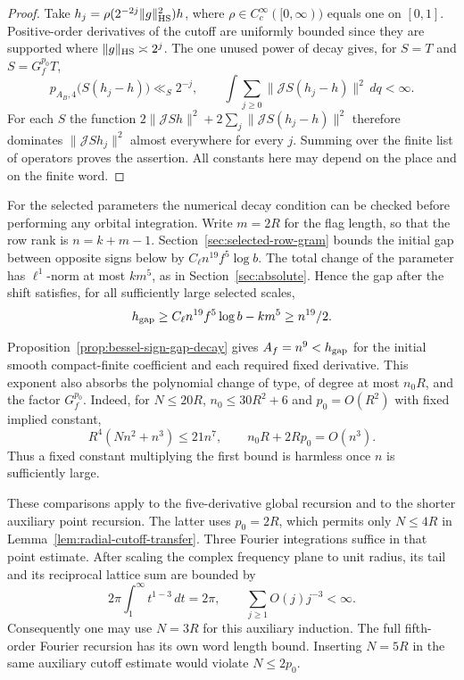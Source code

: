 \begin{proof}
Take \(h_j=\rho(2^{-2j}\|g\|_{\rm HS}^2)h\), where \(\rho\in C_c^\infty([0,\infty))\) equals one on \([0,1]\). Positive-order derivatives of the cutoff are uniformly bounded since they are supported where \(\|g\|_{\rm HS}\asymp 2^j\). The one unused power of decay gives, for \(S=T\) and \(S=G_f^{p_0}T\),
\[
 p_{A_B,4}\bigl(S(h_j-h)\bigr)\ll_S 2^{-j},\qquad
 \int\sum_{j\ge0}\|\mathcal JS(h_j-h)\|^2\,dq<\infty .
\]
For each \(S\) the function \(2\|\mathcal JSh\|^2+2\sum_j\|\mathcal JS(h_j-h)\|^2\) therefore dominates \(\|\mathcal JSh_j\|^2\) almost everywhere for every \(j\). Summing over the finite list of operators proves the assertion. All constants here may depend on the place and on the finite word.
\end{proof}

For the selected parameters the numerical decay condition can be checked before performing any orbital integration. Write \(m=2R\) for the flag length, so that the row rank is \(n=k+m-1\). Section~\ref{sec:selected-row-gram} bounds the initial gap between opposite signs below by \(C_\ell n^{19}f^5\log b\). The total change of the parameter has \(\ell^1\)-norm at most \(km^5\), as in Section~\ref{sec:absolute}. Hence the gap after the shift satisfies, for all sufficiently large selected scales,
\[
     h_{\rm gap}\ge C_\ell n^{19}f^5\log b-km^5\ge n^{19}/2 .
\]

Proposition~\ref{prop:bessel-sign-gap-decay} gives \(A_f=n^9<h_{\rm gap}\) for the initial smooth compact-finite coefficient and each required fixed derivative. This exponent also absorbs the polynomial change of type, of degree at most \(n_0R\), and the factor \(G_f^{p_0}\). Indeed, for \(N\le20R\), \(n_0\le30R^2+6\) and \(p_0=O(R^2)\) with fixed implied constant,
\[
 R^4(Nn^2+n^3)\le21n^7,\qquad n_0R+2Rp_0=O(n^3).
\]
Thus a fixed constant multiplying the first bound is harmless once \(n\) is sufficiently large.

These comparisons apply to the five-derivative global recursion and to the shorter auxiliary point recursion. The latter uses \(p_0=2R\), which permits only \(N\le4R\) in Lemma~\ref{lem:radial-cutoff-transfer}. Three Fourier integrations suffice in that point estimate. After scaling the complex frequency plane to unit radius, its tail and its reciprocal lattice sum are bounded by
\[
         2\pi\int_1^\infty t^{1-3}\,dt=2\pi,\qquad
                       \sum_{j\ge1}O(j)j^{-3}<\infty .
\]
Consequently one may use \(N=3R\) for this auxiliary induction. The full fifth-order Fourier recursion has its own word length bound. Inserting \(N=5R\) in the same auxiliary cutoff estimate would violate \(N\le2p_0\).

